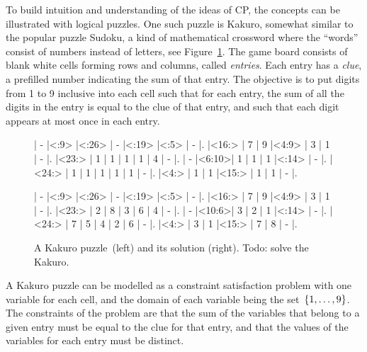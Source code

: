 \documentclass[a4paper,11pt]{article}
\newcommand{\Todo}[1]{{\color{blue}#1}}
\numberwithin{equation}{section}
\begin{document}
To build intuition and understanding of the ideas of CP,
the concepts can be illustrated with logical puzzles. One such
puzzle is Kakuro, somewhat similar to the popular puzzle Sudoku,
a kind of mathematical crossword where the ``words'' consist
of numbers instead of letters, see Figure~\ref{fig:kakuro}.
The game board consists of 
blank white cells forming rows and columns, called \emph{entries}.
Each entry has a \emph{clue}, a prefilled number indicating the sum of that entry.
The objective is to put digits from 1 to 9 inclusive into each cell such 
that for each entry,
the sum of all the digits in the entry is equal to the clue of that entry,
and such that each digit appears at most once in each entry.

\begin{figure}
  \centering
  \begin{minipage}{.45\textwidth}
    
    \begin{Kakuro}{6}{6}
      |  -   |<:9>  |<:26> |  -   |<:19> |<:5>  |  -   |.
      |<16:> |  7   |  9   |<4:9> |  3   |  1   |  -   |.
      |<23:> |  1   |  1   |  1   |  1   |  4   |  -   |.
      |  -   |<6:10>|  1   |  1   |  1   |<:14> |  -   |.
      |<24:> |  1   |  1   |  1   |  1   |  1   |  -   |.
      |<4:>  |  1   |  1   |<15:> |  1   |  1   |  -   |.
    \end{Kakuro}
  \end{minipage}
  \begin{minipage}{.45\textwidth}
    \PuzzleSolution
    \begin{Kakuro}{6}{6}
      |  -   |<:9>  |<:26> |  -   |<:19> |<:5>  |  -   |.
      |<16:> |  7   |  9   |<4:9> |  3   |  1   |  -   |.
      |<23:> |  2   |  8   |  3   |  6   |  4   |  -   |.
      |  -   |<10:6>|  3   |  2   |  1   |<:14> |  -   |.
      |<24:> |  7   |  5   |  4   |  2   |  6   |  -   |.
      |<4:>  |  3   |  1   |<15:> |  7   |  8   |  -   |.
    \end{Kakuro}
  \end{minipage}
  \caption{A Kakuro puzzle~\protect\footnotemark (left) and its solution (right).
  \Todo{Todo: solve the Kakuro.}}
  \label{fig:kakuro}
\end{figure}


A Kakuro puzzle can be modelled as a constraint satisfaction problem with one variable
for each cell, and the domain of each variable being the set~$\left\{1,\ldots,9\right\}$.
The constraints of the problem are that the sum of the variables that
belong to a given entry must be equal to the clue for that entry, and that the
values of the variables for each entry must be distinct.
\end{document}
